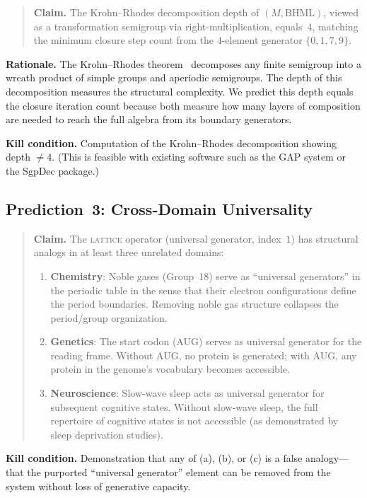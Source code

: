 \documentclass[11pt,a4paper]{article}
\theoremstyle{definition}
\theoremstyle{remark}
\newcommand{\BHML}{\mathrm{BHML}}
\begin{document}
\begin{quote}
\textbf{Claim.} The Krohn--Rhodes decomposition depth of $(M,\BHML)$, viewed as a transformation semigroup via right-multiplication, equals~$4$, matching the minimum closure step count from the $4$-element generator $\{0,1,7,9\}$.
\end{quote}

\textbf{Rationale.} The Krohn--Rhodes theorem~\cite{KrohnRhodes1965} decomposes any finite semigroup into a wreath product of simple groups and aperiodic semigroups. The depth of this decomposition measures the structural complexity. We predict this depth equals the closure iteration count because both measure how many layers of composition are needed to reach the full algebra from its boundary generators.

\textbf{Kill condition.} Computation of the Krohn--Rhodes decomposition showing depth $\neq 4$. (This is feasible with existing software such as the GAP system or the SgpDec package.)

\subsection{Prediction~3: Cross-Domain Universality}\label{sec:pred3}

\begin{quote}
\textbf{Claim.} The \textsc{lattice} operator (universal generator, index~$1$) has structural analogs in at least three unrelated domains:
\begin{enumerate}[label=(\alph*)]
\item \textbf{Chemistry}: Noble gases (Group~18) serve as ``universal generators'' in the periodic table in the sense that their electron configurations define the period boundaries. Removing noble gas structure collapses the period/group organization.
\item \textbf{Genetics}: The start codon (AUG) serves as universal generator for the reading frame. Without AUG, no protein is generated; with AUG, any protein in the genome's vocabulary becomes accessible.
\item \textbf{Neuroscience}: Slow-wave sleep acts as universal generator for subsequent cognitive states. Without slow-wave sleep, the full repertoire of cognitive states is not accessible (as demonstrated by sleep deprivation studies).
\end{enumerate}
\end{quote}

\textbf{Kill condition.} Demonstration that any of (a), (b), or (c) is a false analogy---that the purported ``universal generator'' element can be removed from the system without loss of generative capacity.
\end{document}
